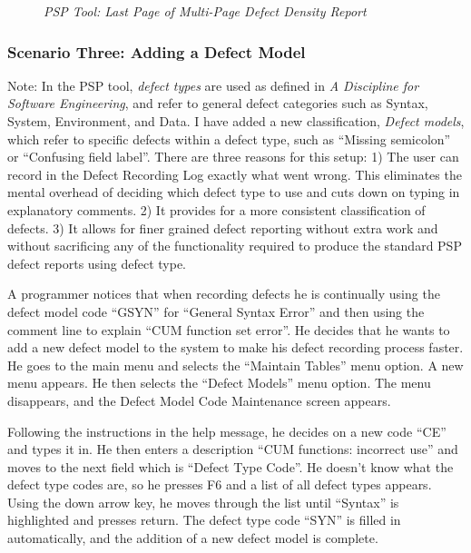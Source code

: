\begin{figure} [htp]
    {\centerline{}}
    \caption[PSP Tool: Defect Density Report]{\label{fig:toolSample2}
    {\em PSP Tool: Last Page of Multi-Page Defect Density Report}}
\end{figure}

\subsubsection{Scenario Three: Adding a Defect Model}
Note: In the PSP tool, {\it defect types} are used as defined in {\it A
Discipline for Software Engineering}, and refer to general defect
categories such as Syntax, System, Environment, and Data. I have added a
new classification, {\it Defect models}, which refer to specific defects
within a defect type, such as ``Missing semicolon'' or ``Confusing field
label''.  There are three reasons for this setup: 1) The user can record in
the Defect Recording Log exactly what went wrong.  This eliminates the
mental overhead of deciding which defect type to use and cuts down on
typing in explanatory comments.  2) It provides for a more consistent
classification of defects.  3) It allows for finer grained defect reporting
without extra work and without sacrificing any of the functionality
required to produce the standard PSP defect reports using defect type.

A programmer notices that when recording defects he is continually using
the defect model code ``GSYN'' for ``General Syntax Error'' and then using
the comment line to explain ``CUM function set error''.  He decides that he
wants to add a new defect model to the system to make his defect recording
process faster. He goes to the main menu and selects the ``Maintain
Tables'' menu option.  A new menu appears.  He then selects the ``Defect
Models'' menu option.  The menu disappears, and the Defect Model Code
Maintenance screen appears.  

Following the instructions in the help message, he decides on a new code
``CE'' and types it in.  He then enters a description ``CUM functions:
incorrect use'' and moves to the next field which is ``Defect Type Code''.
He doesn't know what the defect type codes are, so he presses F6 and a list
of all defect types appears.  Using the down arrow key, he moves through
the list until ``Syntax'' is highlighted and presses return.  The defect
type code ``SYN'' is filled in automatically, and the addition of a new
defect model is complete.

